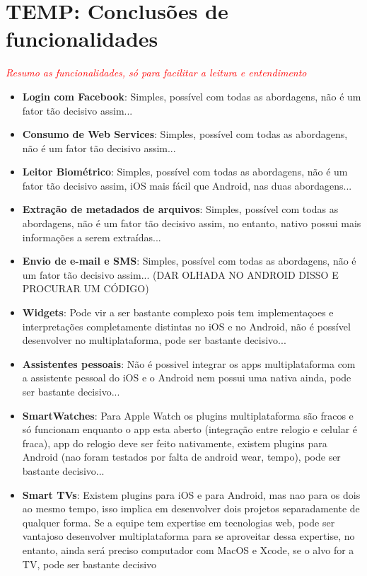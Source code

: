 \section{TEMP: Conclusões de funcionalidades} \label{subsubsec:compa_conclu}

\textcolor{red}{\textit{Resumo as funcionalidades, só para facilitar a leitura e entendimento}}

\begin{itemize}
	\item \textbf{Login com Facebook}: Simples, possível com todas as abordagens, não é um fator tão decisivo assim...
	\item \textbf{Consumo de Web Services}: Simples, possível com todas as abordagens, não é um fator tão decisivo assim...
	\item \textbf{Leitor Biométrico}: Simples, possível com todas as abordagens, não é um fator tão decisivo assim, iOS mais fácil que Android, nas duas abordagens...
	\item \textbf{Extração de metadados de arquivos}: Simples, possível com todas as abordagens, não é um fator tão decisivo assim, no entanto, nativo possui mais informações a serem extraídas...
	\item \textbf{Envio de e-mail e SMS}: Simples, possível com todas as abordagens, não é um fator tão decisivo assim... (DAR OLHADA NO ANDROID DISSO E PROCURAR UM CÓDIGO)
	\item \textbf{Widgets}: Pode vir a ser bastante complexo pois tem implementaçoes e interpretações completamente distintas no iOS e no Android, não é possível desenvolver no multiplataforma, pode ser bastante decisivo...
	\item \textbf{Assistentes pessoais}: Não é possivel integrar os apps multiplataforma com a assistente pessoal do iOS e o Android nem possui uma nativa ainda, pode ser bastante decisivo...
	\item \textbf{SmartWatches}: Para Apple Watch os plugins multiplataforma são fracos e só funcionam enquanto o app esta aberto (integração entre relogio e celular é fraca), app do relogio deve ser feito nativamente, 
	existem plugins para Android (nao foram testados por falta de android wear, tempo), pode ser bastante decisivo...
	\item \textbf{Smart TVs}: Existem plugins para iOS e para Android, mas nao para os dois ao mesmo tempo, isso implica em desenvolver dois projetos separadamente de qualquer forma. Se a equipe tem expertise em tecnologias 
	web, pode ser vantajoso desenvolver multiplataforma para se aproveitar dessa expertise, no entanto, ainda será preciso computador com MacOS e Xcode, se o alvo for a TV, pode ser bastante decisivo 

\end{itemize}
